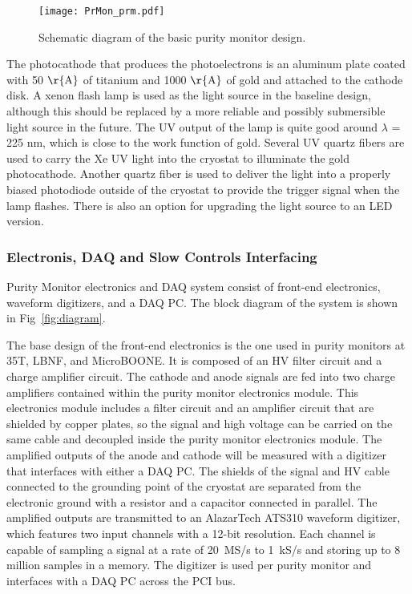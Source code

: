 \begin{figure}[h]
\centering
\texttt{[image: PrMon\_prm.pdf]}
\caption{Schematic diagram of the basic purity monitor design.}\label{fig:prm}
\end{figure}

The photocathode that produces the photoelectrons is an aluminum plate coated with 50 $\rm\r{A}$ of titanium and 1000 $\rm\r{A}$ of gold and attached to the cathode disk. A xenon flash lamp is used as the light source in the baseline design, although this should be replaced by a more reliable and possibly submersible light source in the future. The UV output of the lamp is quite good around $\lambda$ = 225 nm, which is close to the work function of gold. Several UV quartz fibers are used to carry the Xe UV light into the cryostat to illuminate the gold photocathode. Another quartz fiber is used to deliver the light into a properly biased photodiode outside of the cryostat to provide the trigger signal when the lamp flashes. There is also an option for upgrading the light source to an LED version.


\subsubsection{Electronis, DAQ and Slow Controls Interfacing}
Purity Monitor electronics and DAQ system consist of front-end electronics, waveform digitizers, and a DAQ PC.   The block diagram of the system is shown in Fig~\ref{fig:diagram}. 

The base design of the front-end electronics is the one used in purity monitors at 35T, LBNF, and MicroBOONE. It is composed of an HV filter circuit and a charge amplifier circuit. The cathode and anode signals are fed into two charge amplifiers contained within the purity monitor electronics module. This electronics module includes a filter circuit and an amplifier circuit that are shielded by copper plates, so the signal and high voltage can be carried on the same cable and decoupled inside the purity monitor electronics module. The amplified outputs of the anode and cathode will be measured with a digitizer that interfaces with either a DAQ PC. The shields of the signal and HV cable connected to the grounding point of the cryostat are separated from the electronic ground with a resistor and a capacitor connected in parallel. The amplified outputs are transmitted to an AlazarTech ATS310 waveform digitizer, which features two input channels with a 12-bit resolution. Each channel is capable of sampling a signal at a rate of 20~MS/s to 1~kS/s and storing up to 8 million samples in a memory. The digitizer is used per purity monitor and interfaces with a DAQ PC across the PCI bus.

